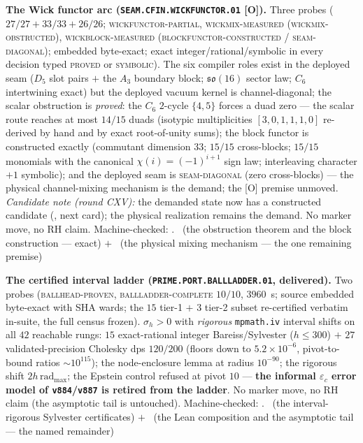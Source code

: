 \documentclass[11pt,a4paper]{article}
\theoremstyle{definition}
\begin{document}
\par\smallskip\noindent\textbf{The Wick functor arc
(\texttt{SEAM.CFIN.\allowbreak WICKFUNCTOR.01} [O]).}
Three probes ($27/27 + 33/33 + 26/26$;
\textsc{wickfunctor-partial}, \textsc{wickmix-measured
(wickmix-obstructed)}, \textsc{wickblock-measured
(blockfunctor-constructed / seam-diagonal)}; embedded
byte-exact; exact integer/rational/symbolic in every decision
typed \textsc{proved} or \textsc{symbolic}).  The six compiler
roles exist in the deployed seam ($D_5$ slot pairs $+$ the
$A_3$ boundary block; $\mathfrak{so}(16)$ sector law; $C_6$
intertwining exact) but the deployed vacuum kernel is
channel-diagonal; the scalar obstruction is \emph{proved}: the
$C_6$ $2$-cycle $\{4, 5\}$ forces a duad zero --- the scalar
route reaches at most $14/15$ duads (isotypic multiplicities
$[3,0,1,1,1,0]$ re-derived by hand and by exact root-of-unity
sums); the block functor is constructed exactly (commutant
dimension $33$; $15/15$ cross-blocks; $15/15$ monomials with
the canonical $\chi(i) = (-1)^{i+1}$ sign law; interleaving
character $+1$ symbolic); and the deployed seam is
\textsc{seam-diagonal} (zero cross-blocks) --- the physical
channel-mixing mechanism is the demand; the [O] premise
unmoved.  \emph{Candidate note (round CXV):} the demanded state
now has a constructed candidate
(, next card); the physical
realization remains the demand.  No marker move, no RH claim.
Machine-checked: .
\mE\ (the obstruction theorem and the block construction ---
exact) $+$ \mO\ (the physical mixing mechanism --- the one
remaining premise)
\par\smallskip

\par\smallskip\noindent\textbf{The certified interval ladder
(\texttt{PRIME.PORT.\allowbreak BALLLADDER.01}, delivered).}
Two probes (\textsc{ballhead-proven},
\textsc{ballladder-complete} $10/10$, $3960$~s; source embedded
byte-exact with SHA wards; the $15$ tier-1 $+$ $3$ tier-2
subset re-certified verbatim in-suite, the full census frozen).
$\sigma_h > 0$ with \emph{rigorous} \texttt{mpmath.iv} interval
shifts on all $42$ reachable rungs: $15$ exact-rational integer
Bareiss/Sylvester ($h \le 300$) $+$ $27$ validated-precision
Cholesky dps $120/200$ (floors down to $5.2\times10^{-6}$,
pivot-to-bound ratios ${\sim}10^{115}$); the node-enclosure
lemma at radius $10^{-90}$; the rigorous shift
$2h\,\mathrm{rad}_{\max}$; the Epstein control refused at pivot
$10$ --- \textbf{the informal $\varepsilon_c$ error model of
\texttt{v884}/\texttt{v887} is retired from the ladder}.  No
marker move, no RH claim (the asymptotic tail is untouched).
Machine-checked: .
\mE\ (the interval-rigorous Sylvester certificates) $+$ \mO\
(the Lean composition and the asymptotic tail --- the named
remainder)
\par\smallskip
\end{document}
